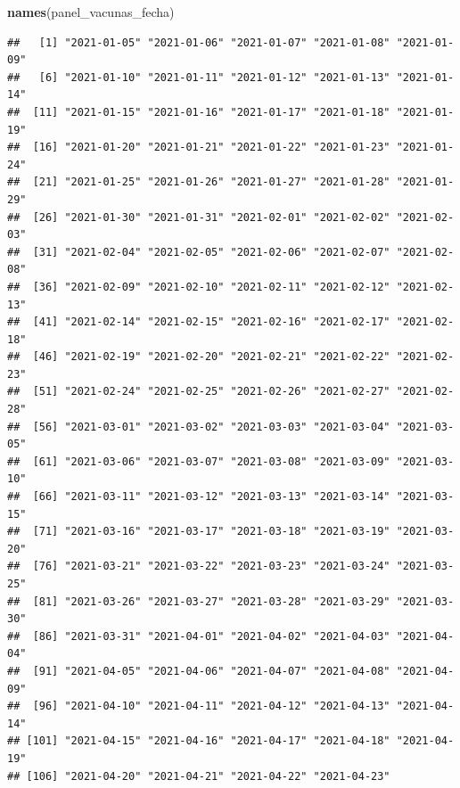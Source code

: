 \documentclass[11pt,]{book}
\newenvironment{Shaded}{\begin{snugshade}}{\end{snugshade}}
\newcommand{\DataTypeTok}[1]{\textcolor[rgb]{0.27,0.27,0.27}{#1}}
\newcommand{\KeywordTok}[1]{\textcolor[rgb]{0.27,0.27,0.27}{\textbf{#1}}}
\newcommand{\NormalTok}[1]{#1}
\newcommand{\OperatorTok}[1]{\textcolor[rgb]{0.43,0.43,0.43}{\textbf{#1}}}
\newcommand{\StringTok}[1]{\textcolor[rgb]{0.5,0.5,0.5}{#1}}
\begin{document}
\begin{Shaded}
\begin{Highlighting}[]
\KeywordTok{names}\NormalTok{(panel_vacunas_fecha)}
\end{Highlighting}
\end{Shaded}

\begin{verbatim}
##   [1] "2021-01-05" "2021-01-06" "2021-01-07" "2021-01-08" "2021-01-09"
##   [6] "2021-01-10" "2021-01-11" "2021-01-12" "2021-01-13" "2021-01-14"
##  [11] "2021-01-15" "2021-01-16" "2021-01-17" "2021-01-18" "2021-01-19"
##  [16] "2021-01-20" "2021-01-21" "2021-01-22" "2021-01-23" "2021-01-24"
##  [21] "2021-01-25" "2021-01-26" "2021-01-27" "2021-01-28" "2021-01-29"
##  [26] "2021-01-30" "2021-01-31" "2021-02-01" "2021-02-02" "2021-02-03"
##  [31] "2021-02-04" "2021-02-05" "2021-02-06" "2021-02-07" "2021-02-08"
##  [36] "2021-02-09" "2021-02-10" "2021-02-11" "2021-02-12" "2021-02-13"
##  [41] "2021-02-14" "2021-02-15" "2021-02-16" "2021-02-17" "2021-02-18"
##  [46] "2021-02-19" "2021-02-20" "2021-02-21" "2021-02-22" "2021-02-23"
##  [51] "2021-02-24" "2021-02-25" "2021-02-26" "2021-02-27" "2021-02-28"
##  [56] "2021-03-01" "2021-03-02" "2021-03-03" "2021-03-04" "2021-03-05"
##  [61] "2021-03-06" "2021-03-07" "2021-03-08" "2021-03-09" "2021-03-10"
##  [66] "2021-03-11" "2021-03-12" "2021-03-13" "2021-03-14" "2021-03-15"
##  [71] "2021-03-16" "2021-03-17" "2021-03-18" "2021-03-19" "2021-03-20"
##  [76] "2021-03-21" "2021-03-22" "2021-03-23" "2021-03-24" "2021-03-25"
##  [81] "2021-03-26" "2021-03-27" "2021-03-28" "2021-03-29" "2021-03-30"
##  [86] "2021-03-31" "2021-04-01" "2021-04-02" "2021-04-03" "2021-04-04"
##  [91] "2021-04-05" "2021-04-06" "2021-04-07" "2021-04-08" "2021-04-09"
##  [96] "2021-04-10" "2021-04-11" "2021-04-12" "2021-04-13" "2021-04-14"
## [101] "2021-04-15" "2021-04-16" "2021-04-17" "2021-04-18" "2021-04-19"
## [106] "2021-04-20" "2021-04-21" "2021-04-22" "2021-04-23"
\end{verbatim}

\begin{Shaded}
\end{Shaded}
\end{document}
